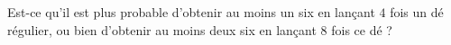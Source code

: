 
\begin{exercice}\label{exoPremiere-0100}

Est-ce qu'il est plus probable d'obtenir au moins un six en lançant \( 4\) fois un dé régulier, ou bien d'obtenir au moins deux six en lançant \( 8\) fois ce dé ?

\end{exercice}
